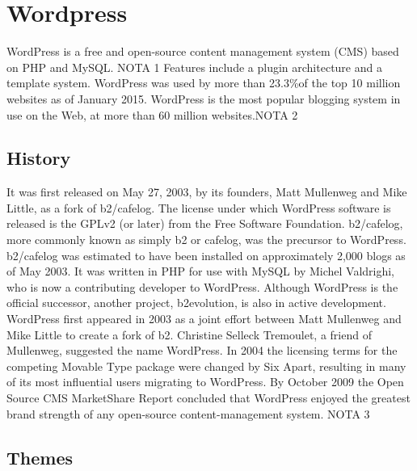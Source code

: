\section{Wordpress}
\label{sec:CMS_wp}

WordPress is a free and open-source content management system (CMS) based on PHP and MySQL. NOTA 1 Features include a plugin architecture and a template system. WordPress was used by more than 23.3\%of the top 10 million websites as of January 2015. WordPress is the most popular blogging system in use on the Web, at more than 60 million websites.NOTA 2


\subsection{History}
\label{subsec:wp_his}
It was first released on May 27, 2003, by its founders, Matt Mullenweg and Mike Little, as a fork of b2/cafelog. The license under which WordPress software is released is the GPLv2 (or later) from the Free Software Foundation.
b2/cafelog, more commonly known as simply b2 or cafelog, was the precursor to WordPress. b2/cafelog was estimated to have been installed on approximately 2,000 blogs as of May 2003. It was written in PHP for use with MySQL by Michel Valdrighi, who is now a contributing developer to WordPress. Although WordPress is the official successor, another project, b2evolution, is also in active development.
WordPress first appeared in 2003 as a joint effort between Matt Mullenweg and Mike Little to create a fork of b2. Christine Selleck Tremoulet, a friend of Mullenweg, suggested the name WordPress.
In 2004 the licensing terms for the competing Movable Type package were changed by Six Apart, resulting in many of its most influential users migrating to WordPress. By October 2009 the Open Source CMS MarketShare Report concluded that WordPress enjoyed the greatest brand strength of any open-source content-management system. NOTA 3



\subsection{Themes}
\label{subsec:wp_themes}


